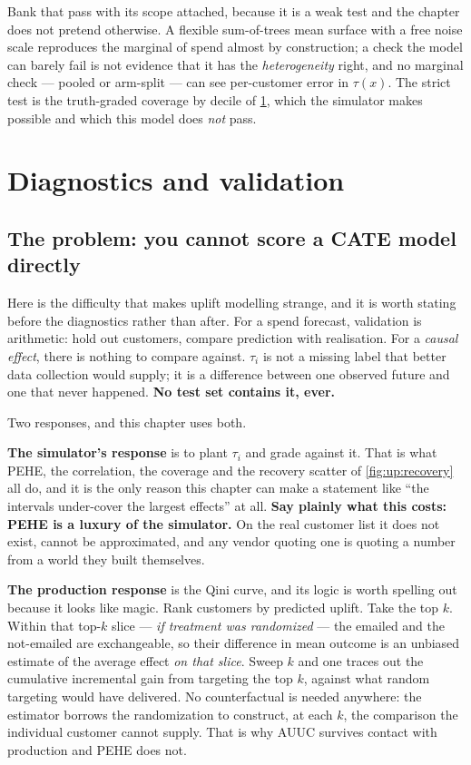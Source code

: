 Bank that pass with its scope attached, because it is a weak test and the chapter does not pretend
otherwise. A flexible sum-of-trees mean surface with a free noise scale reproduces the marginal of
spend almost by construction; a check the model can barely fail is not evidence that it has the
\emph{heterogeneity} right, and no marginal check --- pooled or arm-split --- can see per-customer
error in $\tau(x)$. The strict test is the truth-graded coverage by decile of
\cref{sec:up:valid}, which the simulator makes possible and which this model does \emph{not} pass.




\section{Diagnostics and validation}
\label{sec:up:valid}

\subsection*{The problem: you cannot score a CATE model directly}

Here is the difficulty that makes uplift modelling strange, and it is worth stating before the
diagnostics rather than after. For a spend forecast, validation is arithmetic: hold out customers,
compare prediction with realisation. For a \emph{causal effect}, there is nothing to compare
against. $\tau_i$ is not a missing label that better data collection would supply; it is a
difference between one observed future and one that never happened. \textbf{No test set contains
it, ever.}

Two responses, and this chapter uses both.

\textbf{The simulator's response} is to plant $\tau_i$ and grade against it. That is what PEHE,
the correlation, the coverage and the recovery scatter of \cref{fig:up:recovery} all do, and it
is the only reason this chapter can make a statement like ``the intervals under-cover the largest
effects'' at all. \textbf{Say plainly what this costs: PEHE is a luxury of the simulator.} On the
real customer list it does not exist, cannot be approximated, and any vendor quoting one is
quoting a number from a world they built themselves.

\textbf{The production response} is the Qini curve, and its logic is worth spelling out because
it looks like magic. Rank customers by predicted uplift. Take the top $k$. Within that top-$k$
slice --- \emph{if treatment was randomized} --- the emailed and the not-emailed are exchangeable,
so their difference in mean outcome is an unbiased estimate of the average effect \emph{on that
slice}. Sweep $k$ and one traces out the cumulative incremental gain from targeting the top $k$,
against what random targeting would have delivered. No counterfactual is needed anywhere:
the estimator borrows the randomization to construct, at each $k$, the comparison the individual
customer cannot supply. That is why AUUC survives contact with production and PEHE does not.

